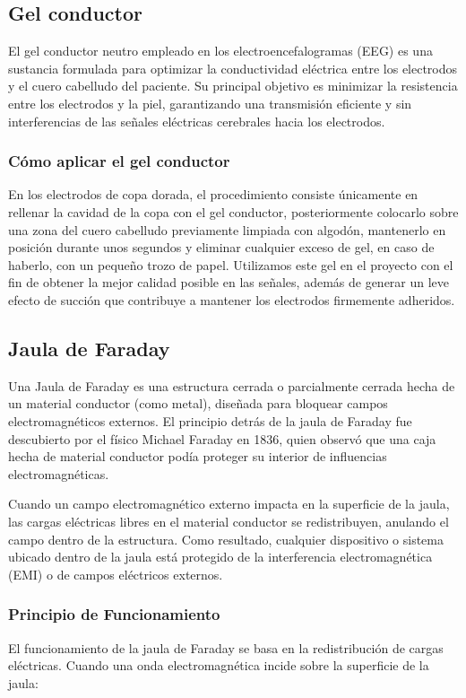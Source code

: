 \documentclass{article}
\begin{document}
\subsection{Gel conductor}
El gel conductor neutro empleado en los electroencefalogramas (EEG) es una sustancia formulada para optimizar la conductividad eléctrica entre los electrodos y el cuero cabelludo del paciente. Su principal objetivo es minimizar la resistencia entre los electrodos y la piel, garantizando una transmisión eficiente y sin interferencias de las señales eléctricas cerebrales hacia los electrodos. 

\subsubsection{Cómo aplicar el gel conductor}
En los electrodos de copa dorada, el procedimiento consiste únicamente en rellenar la cavidad de la copa con el gel conductor, posteriormente colocarlo sobre una zona del cuero cabelludo previamente limpiada con algodón, mantenerlo en posición durante unos segundos y eliminar cualquier exceso de gel, en caso de haberlo, con un pequeño trozo de papel. Utilizamos este gel en el proyecto con el fin de obtener la mejor calidad posible en las señales, además de generar un leve efecto de succión que contribuye a mantener los electrodos firmemente adheridos.

\subsection{Jaula de Faraday}
Una Jaula de Faraday es una estructura cerrada o parcialmente cerrada hecha de un material conductor (como metal), diseñada para bloquear campos electromagnéticos externos. El principio detrás de la jaula de Faraday fue descubierto por el físico Michael Faraday en 1836, quien observó que una caja hecha de material conductor podía proteger su interior de influencias electromagnéticas.

Cuando un campo electromagnético externo impacta en la superficie de la jaula, las cargas eléctricas libres en el material conductor se redistribuyen, anulando el campo dentro de la estructura. Como resultado, cualquier dispositivo o sistema ubicado dentro de la jaula está protegido de la interferencia electromagnética (EMI) o de campos eléctricos externos.

\subsubsection{Principio de Funcionamiento}
El funcionamiento de la jaula de Faraday se basa en la redistribución de cargas eléctricas. Cuando una onda electromagnética incide sobre la superficie de la jaula:
\end{document}
